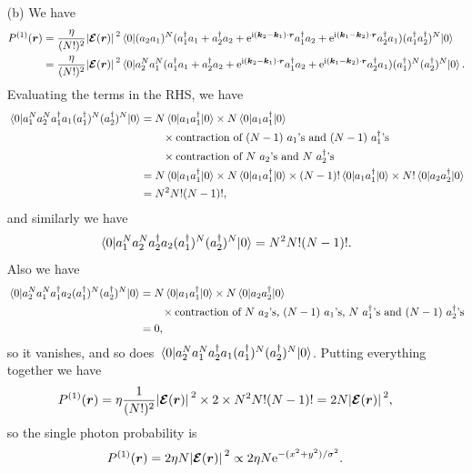 \documentclass[hyperref, a4paper]{article}
\newcommand*{\ii}{\mathrm{i}}
\newcommand*{\ee}{\mathrm{e}}
\begin{document}
\begin{itemize}
\item[(b)] We have 
\[
    \begin{aligned}
        P^{(1)}(\vb*{r}) &= \frac{\eta}{(N!)^2} \abs*{\vb*{\mathcal{E}}(\vb*{r})}^2 \expval*{(a_2 a_1)^N (a_1^\dagger a_1 + a_2^\dagger a_2 + \ee^{\ii (\vb*{k}_2 - \vb*{k}_1) \cdot \vb*{r}} a_1^\dagger a_2 + \ee^{\ii (\vb*{k}_1 - \vb*{k}_2) \cdot \vb*{r}} a_2^\dagger a_1 ) (a_1^\dagger a_2^\dagger)^N}{0} \\
        &= \frac{\eta}{(N!)^2} \abs*{\vb*{\mathcal{E}}(\vb*{r})}^2 \expval*{a_2^N a_1^N (a_1^\dagger a_1 + a_2^\dagger a_2 + \ee^{\ii (\vb*{k}_2 - \vb*{k}_1) \cdot \vb*{r}} a_1^\dagger a_2 + \ee^{\ii (\vb*{k}_1 - \vb*{k}_2) \cdot \vb*{r}} a_2^\dagger a_1 ) (a_1^\dagger)^N (a_2^\dagger)^N}{0}.
    \end{aligned}
\] 
Evaluating the terms in the RHS, we have 
\[
    \begin{aligned}
        \expval*{a_1^N a_2^N a_1^\dagger a_1 (a_1^\dagger)^N (a_2^\dagger)^N}{0} 
        &= N \expval*{a_1 a_1^\dagger}{0} \times N \expval*{a_1 a_1^\dagger}{0} \\
        &\quad \quad \times \text{contraction of $(N-1)$ $a_1$'s and $(N-1)$ $a_1^\dagger$'s} \\
        &\quad \quad \times \text{contraction of $N$ $a_2$'s and $N$ $a_2^\dagger$'s} \\
        &= N \expval*{a_1 a_1^\dagger}{0} \times N \expval*{a_1 a_1^\dagger}{0} 
        \times (N-1)! \expval*{a_1 a_1^\dagger}{0} \times N! \expval*{a_2 a_2^\dagger}{0} \\
        &= N^2 N! (N-1)!,
    \end{aligned}
\]
and similarly we have 
\[
    \expval*{a_1^N a_2^N a_2^\dagger a_2 (a_1^\dagger)^N (a_2^\dagger)^N}{0} = N^2 N! (N-1)!.
\]
Also we have 
\[
    \begin{aligned}
        \expval*{a_2^N a_1^N a_1^\dagger a_2 (a_1^\dagger)^N (a_2^\dagger)^N}{0}
        &= N \expval*{a_1 a_1^\dagger}{0} \times N \expval*{a_2 a_2^\dagger}{0}  \\
        &\quad \quad \times \text{contraction of $N$ $a_2$'s, $(N-1)$ $a_1$'s, $N$ $a_1^\dagger$'s and $(N-1)$ $a^\dagger_2$'s} \\
        &= 0, 
    \end{aligned}
\]
so it vanishes, and so does $\expval*{a_2^N a_1^N a_2^\dagger a_1 (a_1^\dagger)^N (a_2^\dagger)^N}{0}$.
Putting everything together we have 
\[
    P^{(1)}(\vb*{r}) = \eta \frac{1}{(N!)^2} \abs*{\vb*{\mathcal{E}}(\vb*{r})}^2 \times 2 \times N^2 N! (N-1)! = 2 N \abs*{\vb*{\mathcal{E}}(\vb*{r})}^2,
\]
so the single photon probability is 
\begin{equation}
    P^{(1)}(\vb*{r}) = 2 \eta N \abs*{\vb*{\mathcal{E}}(\vb*{r})}^2 \propto 2 \eta N \ee^{- (x^2 + y^2) / \sigma^2}.
\end{equation}


\end{itemize}
\end{document}
